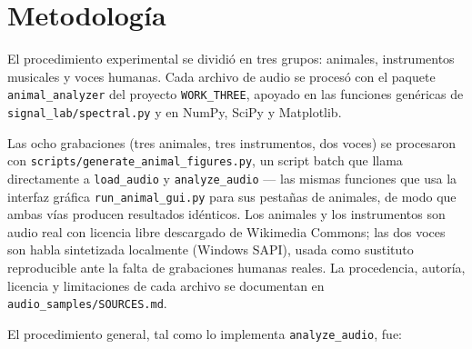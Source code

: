 
\section{Metodología}

El procedimiento experimental se dividió en tres grupos: animales, instrumentos musicales y voces humanas. Cada archivo de audio se procesó con el paquete \texttt{animal\_analyzer} del proyecto \texttt{WORK\_THREE}, apoyado en las funciones genéricas de \texttt{signal\_lab/spectral.py} y en NumPy, SciPy \cite{scipy} y Matplotlib.

Las ocho grabaciones (tres animales, tres instrumentos, dos voces) se procesaron con \texttt{scripts/generate\_animal\_figures.py}, un script batch que llama directamente a \texttt{load\_audio} y \texttt{analyze\_audio} — las mismas funciones que usa la interfaz gráfica \texttt{run\_animal\_gui.py} para sus pestañas de animales, de modo que ambas vías producen resultados idénticos. Los animales y los instrumentos son audio real con licencia libre descargado de Wikimedia Commons; las dos voces son habla sintetizada localmente (Windows SAPI), usada como sustituto reproducible ante la falta de grabaciones humanas reales. La procedencia, autoría, licencia y limitaciones de cada archivo se documentan en \texttt{audio\_samples/SOURCES.md}.

El procedimiento general, tal como lo implementa \texttt{analyze\_audio}, fue:

